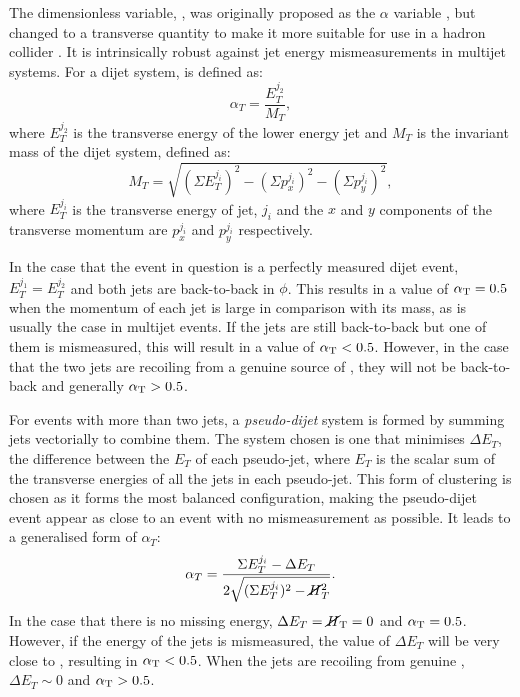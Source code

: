 The dimensionless variable, \alphat, was originally proposed as the
$\alpha$ variable \cite{Randall:2008rw}, but changed to a transverse
quantity to make it more suitable for use in a hadron collider
\cite{CMS-PAS-SUS-08-005,CMS-PAS-SUS-09-001}. It is intrinsically
robust against jet energy mismeasurements in multijet systems. For a
dijet system, \alphat is defined as: 
\begin{equation}
\alpha_T=\frac{E_T^{j_2}}{M_T}, 
\end{equation} 
where $E_T^{j_2}$ is the transverse energy of the lower energy jet and
$M_T$ is the invariant mass of the dijet
system, defined as:
\begin{equation}
M_T=\sqrt{(\Sigma E_T^{j_i})^2-(\Sigma p_x^{j_i})^2-(\Sigma
p_y^{j_i})^2},
\end{equation}
where $E_T^{j_i}$ is the transverse energy of jet, $j_i$ and the $x$
and $y$ components of the transverse momentum are $p_x^{j_i}$ and
$p_y^{j_i}$ respectively.

In the case that the event in question is a perfectly measured dijet
event, $E_T^{j_1}=E_T^{j_2}$ and both jets are back-to-back in $\phi$.
This results in a value of $\alpha_{\text{T}}=0.5$ when the momentum of each jet
is large in comparison with its mass, as is usually the case in
\QCD multijet events. If the jets are still back-to-back but one of
them is mismeasured, this will result in a value of $\alpha_{\text{T}}<0.5$.
However, in the case that the two jets are recoiling from a genuine
source of \MET, they will not be back-to-back and generally $\alpha_{\text{T}}>0.5$.

For events with more than two jets, a \emph{pseudo-dijet} system is
formed by summing jets vectorially to combine them.  The system chosen
is one that minimises $\Delta E_T$, the difference between the $E_T$
of each pseudo-jet, where $E_T$ is the scalar sum of the transverse
energies of all the jets in each pseudo-jet. This form of clustering
is chosen as it forms the most balanced configuration, making the
pseudo-dijet event appear as close to an event with no mismeasurement
as possible. %
It leads to a generalised form of $\alpha_T$: 
\begin{equation}
\alpha_T=\frac{\Sigma E_T^{j_i}-\Delta
E_T}{2\sqrt{(\Sigma E_T^{j_i})^2-\cancel{H}_T^2}}.
\end{equation} 
In the case that there is no missing energy, $\Delta
E_T=\mbox{$\cancel{H}_\text{T}$}=0$ and $\alpha_{\text{T}}=0.5$. However, if the energy of the jets is
mismeasured, the value of $\Delta E_T$ will be very close to \MET,
resulting in $\alpha_{\text{T}}<0.5$. When the jets are recoiling from genuine
\MET, $\Delta E_T\sim 0$ and $\alpha_{\text{T}}>0.5$.
  
